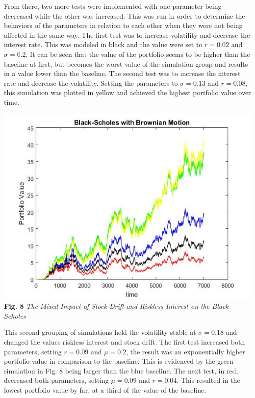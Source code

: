 \documentclass{report}
\begin{document}
	From there, two more tests were implemented with one parameter being decreased while the other was increased. This was run in order to determine the behaviors of the parameters in relation to each other when they were not being affected in the same way. The first test was to increase volatility and decrease the interest rate. This was modeled in black and the value were set to $r=0.02$ and $\sigma = 0.2$. It can be seen that the value of the portfolio seems to be higher than the baseline at first, but becomes the worst value of the simulation group and results in a value lower than the baseline. The second test was to increase the interest rate and decrease the volatility. Setting the parameters to $\sigma = 0.13$ and $r=0.08$, this simulation was plotted in yellow and achieved the highest portfolio value over time.
	\begin{center}
		\includegraphics[scale=0.4]{idimpact}
		\\ \textbf{Fig. 8} \textit{The Mixed Impact of Stock Drift and Riskless Interest on the Black-Scholes}
	\end{center}
	
	This second grouping of simulations held the volatility stable at $\sigma = 0.18$ and changed the values riskless interest and stock drift. The first test increased both parameters, setting $r=0.09$ and $\mu =0.2$, the result was an exponentially higher portfolio value in comparison to the baseline. This is evidenced by the green simulation in Fig. 8 being larger than the blue baseline. The next test, in red, decreased both parameters, setting $\mu = 0.09$ and $r=0.04$. This resulted in the lowest portfolio value by far, at a third of the value of the baseline.\\
	
\end{document}
